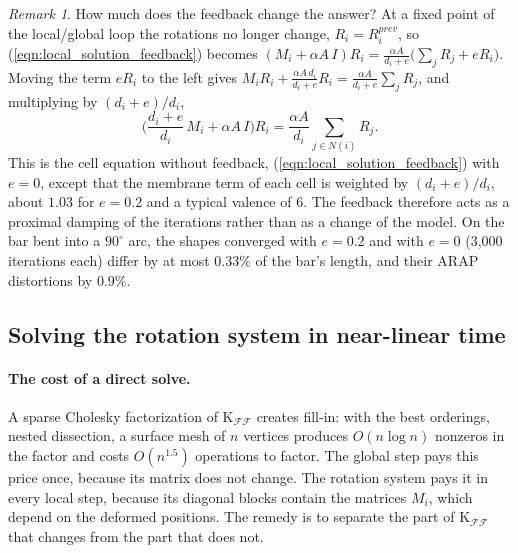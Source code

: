 \documentclass{birkjour}
\theoremstyle{remark}
\newtheorem{rem}[thm]{Remark}
\numberwithin{equation}{section}
\begin{document}
\begin{rem}
\label{rem:feedback_bias}
How much does the feedback change the answer? At a fixed point of the local/global loop the rotations no longer change, $R_i = R^{prev}_i$, so (\ref{eqn:local_solution_feedback}) becomes $(M_i + \alpha A \, I) R_i = \frac{\alpha A}{d_i + e} \big( \sum_{j} R_j + e R_i \big)$. Moving the term $e R_i$ to the left gives $M_i R_i + \frac{\alpha A \, d_i}{d_i + e} R_i = \frac{\alpha A}{d_i + e} \sum_j R_j$, and multiplying by $(d_i + e)/d_i$,
\begin{equation*}
\Big( \frac{d_i + e}{d_i} \, M_i + \alpha A \, I \Big) R_i = \frac{\alpha A}{d_i} \sum_{j \in N(i)} R_j .
\end{equation*}
This is the cell equation without feedback, (\ref{eqn:local_solution_feedback}) with $e = 0$, except that the membrane term of each cell is weighted by $(d_i + e)/d_i$, about $1.03$ for $e = 0.2$ and a typical valence of 6. The feedback therefore acts as a proximal damping of the iterations rather than as a change of the model. On the bar bent into a $90^\circ$ arc, the shapes converged with $e = 0.2$ and with $e = 0$ (3{,}000 iterations each) differ by at most $0.33\%$ of the bar's length, and their ARAP distortions by $0.9\%$.
\end{rem}

\subsection{Solving the rotation system in near-linear time}
\label{section:pcg}

\paragraph{The cost of a direct solve.} A sparse Cholesky factorization of $\mathrm K_{\mathcal F \mathcal F}$ creates fill-in: with the best orderings, nested dissection, a surface mesh of $n$ vertices produces $O(n \log n)$ nonzeros in the factor and costs $O(n^{1.5})$ operations to factor. The global step pays this price once, because its matrix does not change. The rotation system pays it in every local step, because its diagonal blocks contain the matrices $M_i$, which depend on the deformed positions. The remedy is to separate the part of $\mathrm K_{\mathcal F \mathcal F}$ that changes from the part that does not.
\end{document}
